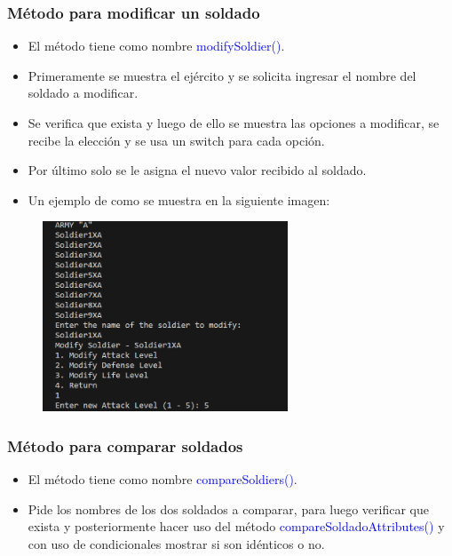 \documentclass{article}
\begin{document}
\subsubsection{Método para modificar un soldado}
\begin{itemize}
    \item El método tiene como nombre \textcolor{blue}{modifySoldier()}.
    \item Primeramente se muestra el ejército y se solicita ingresar el nombre del soldado a modificar.
    \item Se verifica que exista y luego de ello se muestra las opciones a modificar, se recibe la elección y se usa un switch para cada opción.
    \item Por último solo se le asigna el nuevo valor recibido al soldado.
\end{itemize}


\begin{itemize}\begin{itemize}\item Un ejemplo de como se muestra en la siguiente imagen:
\end{itemize}\end{itemize}
\begin{figure}[H]
    \centering
    \includegraphics[width=0.65\textwidth,keepaspectratio]{img/12modifySoldier.png}
    \caption{}
\end{figure}

\newpage


\subsubsection{Método para comparar soldados}
\begin{itemize}
    \item El método tiene como nombre \textcolor{blue}{compareSoldiers()}.
    \item Pide los nombres de los dos soldados a comparar, para luego verificar que exista y posteriormente hacer uso del método \textcolor{blue}{compareSoldadoAttributes()} y con uso de condicionales mostrar si son idénticos o no.
\end{itemize}

\end{document}
